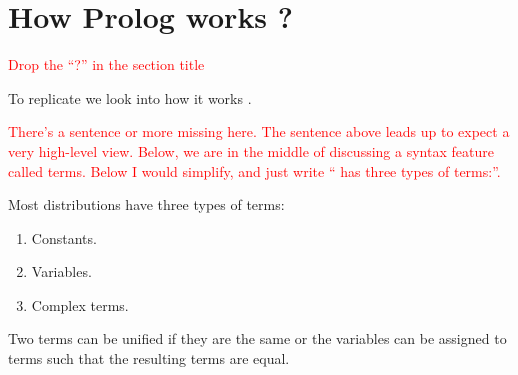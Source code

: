 \documentclass[thesis-solanki.tex]{subfiles}
\begin{document}
\section{How Prolog works ?}

\textcolor{red}{Drop the ``?'' in the section title}

To replicate  we look into how it works \cite{webiste:learnprolognow}.

\textcolor{red}{There's a sentence or more missing here. The sentence above leads up to expect a very
  high-level view.  Below, we are in the middle of discussing a syntax feature called terms.
  Below I would simplify, and just write `` has three types of terms:''.
} 

Most  distributions have three types of terms:
\begin{enumerate}
\item Constants.

\item Variables.

\item Complex terms.
\end{enumerate}

Two terms can be unified if they are the same or the variables can be assigned to terms such that the resulting terms are equal.
\end{document}
